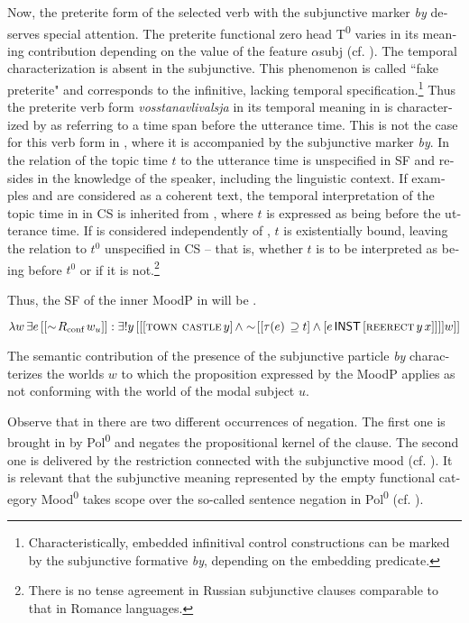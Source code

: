 \documentclass[output=paper,colorlinks,citecolor=brown]{langscibook}
\begin{document}
\begin{otherlanguage}{english}
Now, the preterite form of the selected verb with the subjunctive marker \textit{by} deserves special attention. The preterite functional zero head T\textsuperscript{0} varies in its meaning contribution depending on the value of the feature $\alpha$subj (cf. ). The temporal characterization is absent in the subjunctive. This phenomenon is called ``fake preterite" and corresponds to the infinitive, lacking temporal specification.\footnote{Characteristically, embedded infinitival control constructions can be marked by the subjunctive formative \textit{by}, depending on the embedding predicate.
} Thus the preterite verb form \textit{vosstanavlivalsja} in its temporal meaning in  is characterized by  as referring to a time span before the utterance time. This is not the case for this verb form in , where it is accompanied by the subjunctive marker \textit{by}. In  the relation of the topic time $t$ to the utterance time is unspecified in SF and resides in the knowledge of the speaker, including the linguistic context. If examples   and  are considered as a coherent text, the temporal interpretation of the topic time in   in CS is inherited from  , where $t$ is expressed as being before the utterance time. If  is considered independently of , $t$ is existentially bound, leaving the relation to $t^0$ unspecified in CS -- that is, whether $t$ is to be interpreted as being before $t^0$ or if it is not.\footnote{There is no tense agreement in Russian subjunctive clauses comparable to that in Romance languages.
}  

Thus, the SF of the inner MoodP in  will be .

\begin{exe}
\ex  \label{ex:16:20}
$\lambda w \, \exists e \, [[\sim \negthinspace R_\text{conf} \, w_{u}]] : \exists ! y \, [[[\textsc{town castle} \, y] \, \wedge \sim \negthinspace  [[\tau (e) \, \supseteq t] \newline  
\wedge [e \, \cnst{inst} \, [\textsc{reerect} \, y \, x]]]]w]]  $
\end{exe}

\noindent The semantic contribution of the presence of the subjunctive particle \textit{by}  characterizes the worlds $w$ to which the proposition expressed by the MoodP applies as not conforming with the world of the modal subject $u$.

Observe that in  there are two different occurrences of negation. The first one is brought in by Pol\textsuperscript{0} and negates the propositional kernel of the clause. The second one is delivered by the restriction connected with the subjunctive mood (cf. ). It is relevant that the subjunctive meaning represented by the empty functional category Mood\textsuperscript{0} takes scope over the so-called sentence negation in Pol\textsuperscript{0} (cf. ).


\end{otherlanguage}
\end{document}
